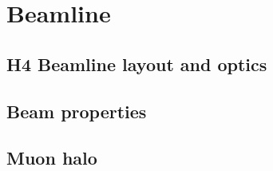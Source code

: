 \section{Beamline}
\label{sec:h4beamline}

\subsection{H4 Beamline layout and optics}

\subsection{Beam properties}

\subsection{Muon halo}




